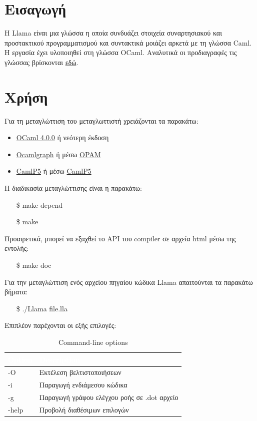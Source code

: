 \documentclass[12pt]{article}
\newcommand{\Llama}{\textsf{Llama }}
\begin{document}
\section{Εισαγωγή}
H \Llama είναι μια γλώσσα η οποία συνδυάζει στοιχεία συναρτησιακού και προστακτικού προγραμματισμού και συντακτικά μοιάζει αρκετά με τη γλώσσα Caml. Η εργασία έχει υλοποιηθεί στη γλώσσα OCaml. Αναλυτικά οι προδιαγραφές τις γλώσσας βρίσκονται \href{http://courses.softlab.ntua.gr/compilers/2012a/llama2012.pdf}{εδώ}.
\section{Χρήση}
Για τη μεταγλώττιση του μεταγλωττιστή χρειάζονται τα παρακάτω:
\begin{itemize}
\item \href{http://ocaml.org/install.html}{OCaml 4.0.0} ή νεότερη έκδοση
\item \href{http://ocamlgraph.lri.fr}{Ocamlgraph} ή μέσω \href{http://opam.ocaml.org/pkg/ocamlgraph/}{OPAM}
\item \href{http://pauillac.inria.fr/~ddr/camlp5/}{CamlP5} ή μέσω \href{http://opam.ocaml.org/pkg/camlp5}{CamlP5}
\end{itemize}

Η διαδικασία μεταγλώττισης είναι η παρακάτω:
\begin{itemize}
\item[\$] make depend
\item[\$] make
\end{itemize}
Προαιρετικά, μπορεί να εξαχθεί το API του compiler σε αρχεία html μέσω της εντολής:
\begin{itemize}
\item[\$] make doc
\end{itemize}
Για την μεταγλώττιση ενός αρχείου πηγαίου κώδικα \Llama απαιτούνται τα παρακάτω βήματα:
\begin{itemize}
\item[\$] ./Llama file.lla
\end{itemize}
Επιπλέον παρέχονται οι εξής επιλογές:

\begin{table}[htbp]
\centering
\begin{tabular}{|l|l|}
\hline
   \rowcolor{ablack}
    \textcolor{white}{Option} & \textcolor{white}{Description} \\ \hline
    
    \rowcolor{gray}
    -O & Εκτέλεση βελτιστοποιήσεων \\ 
    
    -i & Παραγωγή ενδιάμεσου κώδικα \\ 
    
     \rowcolor{gray}
    -g & Παραγωγή γράφου ελέγχου ροής σε .dot αρχείο \\
    
    -help & Προβολή διαθέσιμων επιλογών \\ 
    
\hline
\end{tabular}
\caption{Command-line options}
\end{table}
\end{document}
